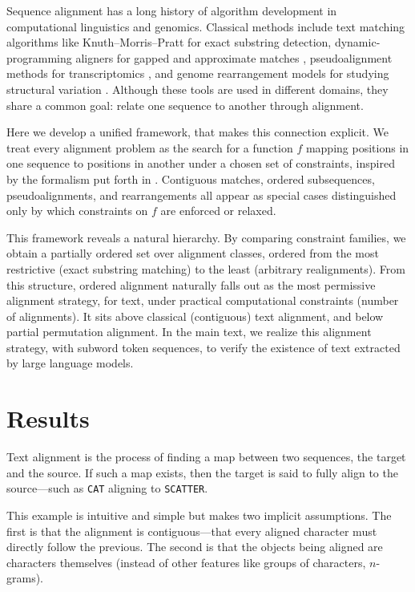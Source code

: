 Sequence alignment has a long history of algorithm development in computational linguistics and genomics. Classical methods include text matching algorithms like Knuth–Morris–Pratt \citep{KnuthMorrisPratt1977} for exact substring detection, dynamic-programming aligners for gapped and approximate matches \citep{needlemanwunsch1970, smithwaterman1981}, pseudoalignment methods for transcriptomics \citep{Bray2016kallisto}, and genome rearrangement models for studying structural variation \citep{hannenhallipevzner1999permutations, tesler2002grimm}. Although these tools are used in different domains, they share a common goal: relate one sequence to another through alignment.

Here we develop a unified framework, that makes this connection explicit. We treat every alignment problem as the search for a function $f$ mapping positions in one sequence to positions in another under a chosen set of constraints, inspired by the formalism put forth in \citep{schwartz2007seqanneal}. Contiguous matches, ordered subsequences, pseudoalignments, and rearrangements all appear as special cases distinguished only by which constraints on $f$ are enforced or relaxed.

This framework reveals a natural hierarchy. By comparing constraint families, we obtain a partially ordered set over alignment classes, ordered from the most restrictive (exact substring matching) to the least (arbitrary realignments). From this structure, ordered alignment naturally falls out as the most permissive alignment strategy, for text, under practical computational constraints (number of alignments). It sits above classical (contiguous) text alignment, and below partial permutation alignment. In the main text, we realize this alignment strategy, with subword token sequences, to verify the existence of text extracted by large language models. 

\section{Results}
Text alignment is the process of finding a map between two sequences, the target and the source. If such a map exists, then the target is said to fully align to the source---such as \texttt{CAT} aligning to \texttt{SCATTER}. 

This example is intuitive and simple but makes two implicit assumptions. The first is that the alignment is contiguous---that every aligned character must directly follow the previous. The second is that the objects being aligned are characters themselves (instead of other features like groups of characters, $n$-grams). 

